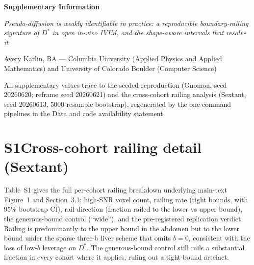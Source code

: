 \documentclass[11pt]{article}
\newcommand{\Dstar}{\ensuremath{D^{*}}}
\begin{document}
\begin{center}
{\Large\bfseries Supplementary Information\par}
\vspace{0.6em}
{\itshape Pseudo-diffusion is weakly identifiable in practice: a reproducible
boundary-railing signature of \Dstar{} in open in-vivo IVIM, and the shape-aware
intervals that resolve it\par}
\vspace{0.4em}
Avery Karlin, BA --- Columbia University (Applied Physics and Applied Mathematics) and
University of Colorado Boulder (Computer Science)
\end{center}

\vspace{0.5em}

All supplementary values trace to the seeded reproduction (Gnomon, seed 20260620;
reframe seed 20260621) and the cross-cohort railing analysis (Sextant, seed 20260613,
5000-resample bootstrap), regenerated by the one-command pipelines in the Data and code
availability statement.

\section*{S1\quad Cross-cohort railing detail (Sextant)}

Table~S1 gives the full per-cohort railing breakdown underlying main-text Figure~1 and
Section~3.1: high-SNR voxel count, railing rate (tight bounds, with 95\% bootstrap CI),
rail direction (fraction railed to the lower vs upper bound), the generous-bound control
(``wide''), and the pre-registered replication verdict. Railing is predominantly to the
upper bound in the abdomen but to the lower bound under the sparse three-b liver scheme
that omits $b=0$, consistent with the loss of low-$b$ leverage on \Dstar{}. The
generous-bound control still rails a substantial fraction in every cohort where it
applies, ruling out a tight-bound artefact.
\end{document}

